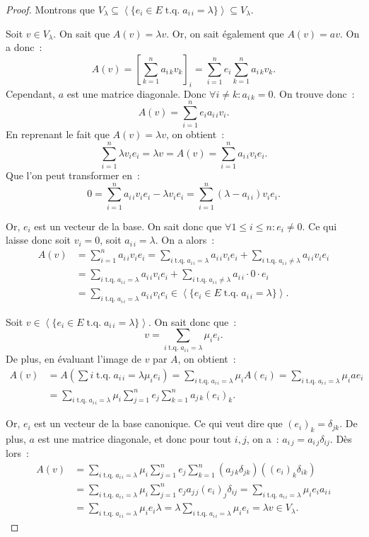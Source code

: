 \documentclass{article}
\DeclareMathOperator{\tq}{\text{ t.q. }}
\newcommand{\eng}[1]{\left\langle#1\right\rangle}
\theoremstyle{definition}
\theoremstyle{remark}
\begin{document}
		\begin{proof} Montrons que $V_\lambda \subseteq \eng {\{e_i \in E \tq a_{i\,i} = \lambda\}} \subseteq V_\lambda$.

		Soit $v \in V_\lambda$. On sait que $A(v) = \lambda v$. Or, on sait également que $A(v) = av$. On a donc~:
		\[A(v) = \left[\sum_{k=1}^na_{i\,k}v_k\right]_i= \sum_{i=1}^ne_i\sum_{k=1}^na_{i\,k}v_k.\]
		Cependant, $a$ est une matrice diagonale. Donc $\forall i \neq k : a_{i\,k} = 0$. On trouve donc~:
		\[A(v) = \sum_{i=1}^ne_ia_{i\,i}v_i.\]
		En reprenant le fait que $A(v) = \lambda v$, on obtient~:
		\[\sum_{i=1}^n\lambda v_ie_i = \lambda v = A(v) = \sum_{i=1}^na_{i\,i}v_ie_i.\]
		Que l'on peut transformer en~:
		\[0 = \sum_{i=1}^na_{i\,i}v_ie_i - \lambda v_ie_i = \sum_{i=1}^n(\lambda - a_{i\,i})v_ie_i.\]

		Or, $e_i$ est un vecteur de la base. On sait donc que $\forall 1 \leq i \leq n : e_i \neq 0$. Ce qui laisse donc soit $v_i = 0$, soit $a_{i\,i} = \lambda$.
		On a alors~:
		\[\begin{aligned}
			A(v) &= \sum_{i=1}^na_{i\,i}v_ie_i = \sum_{i \tq a_{i\,i} = \lambda}a_{i\,i}v_ie_i + \sum_{i \tq a_{i\,i} \neq \lambda}a_{i\,i}v_ie_i \\
			     &= \sum_{i \tq a_{i\,i} = \lambda}a_{i\,i}v_ie_i + \sum_{i \tq a_{i\,i} \neq \lambda}a_{i\,i} \cdot 0 \cdot e_i \\
				 &= \sum_{i \tq a_{i\,i} = \lambda}a_{i\,i}v_ie_i \in \eng {\{e_i \in E \tq a_{i\,i} = \lambda\}}.
		\end{aligned}\]

		Soit $v \in \eng {\{e_i \in E \tq a_{i\,i} = \lambda\}}$. On sait donc que~:
		\[v = \sum_{i \tq a_{i\,i} = \lambda}\mu_ie_i.\]
		De plus, en évaluant l'image de $v$ par $A$, on obtient~:
		\[\begin{aligned}
			A(v) &= A\left(\sum{i \tq a_{i\,i} = \lambda}\mu_ie_i\right) = \sum_{i \tq a_{i\,i}=\lambda}\mu_iA(e_i)= \sum_{i \tq a_{i\,i}=\lambda}\mu_iae_i \\
			     &= \sum_{i \tq a_{i\,i}=\lambda}\mu_i\sum_{j=1}^ne_j\sum_{k=1}^na_{j\,k}\left(e_i\right)_k.
		\end{aligned}\]

		Or, $e_i$ est un vecteur de la base canonique. Ce qui veut dire que $\left(e_i\right)_k = \delta_{jk}$. De plus, $a$ est une matrice diagonale, et donc
		pour tout $i, j$, on a~: $a_{i\,j} = a_{i\,j}\delta_{ij}$. Dès lors~:
		\[\begin{aligned}
			A(v) &=\sum_{i \tq a_{i\,i}=\lambda}\mu_i\sum_{j=1}^ne_j\sum_{k=1}^n\left(a_{j\,k}\delta_{jk}\right)\left(\left(e_i\right)_k\delta_{ik}\right) \\
			     &= \sum_{i \tq a_{i\,i}=\lambda}\mu_i\sum_{j=1}^ne_ja_{j\,j}\left(e_i\right)_j\delta_{ij} = \sum_{i \tq a_{i\,i}=\lambda}\mu_ie_ia_{i\,i} \\
				 &= \sum_{i \tq a_{i\,i}=\lambda}\mu_ie_i\lambda = \lambda\sum_{i \tq a_{i\,i}=\lambda}\mu_ie_i = \lambda v \in V_\lambda.
		\end{aligned}\]
		\end{proof}
\end{document}
